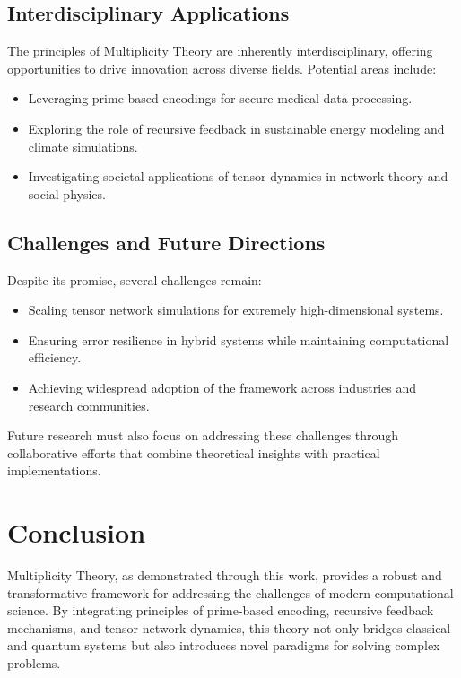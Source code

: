 \documentclass{article}
\theoremstyle{plain}
\begin{document}
\subsection{Interdisciplinary Applications}
The principles of Multiplicity Theory are inherently interdisciplinary, offering opportunities to drive innovation across diverse fields. Potential areas include:
\begin{itemize}
    \item Leveraging prime-based encodings for secure medical data processing.
    \item Exploring the role of recursive feedback in sustainable energy modeling and climate simulations.
    \item Investigating societal applications of tensor dynamics in network theory and social physics.
\end{itemize}

\subsection{Challenges and Future Directions}
Despite its promise, several challenges remain:
\begin{itemize}
    \item Scaling tensor network simulations for extremely high-dimensional systems.
    \item Ensuring error resilience in hybrid systems while maintaining computational efficiency.
    \item Achieving widespread adoption of the framework across industries and research communities.
\end{itemize}

Future research must also focus on addressing these challenges through collaborative efforts that combine theoretical insights with practical implementations.


\section{Conclusion}

Multiplicity Theory, as demonstrated through this work, provides a robust and transformative framework for addressing the challenges of modern computational science. By integrating principles of prime-based encoding, recursive feedback mechanisms, and tensor network dynamics, this theory not only bridges classical and quantum systems but also introduces novel paradigms for solving complex problems.
\end{document}
